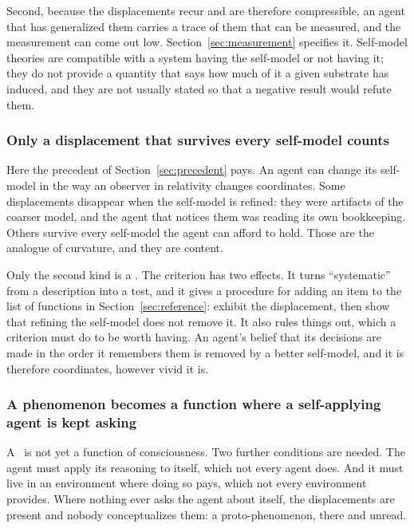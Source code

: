 Second, because the displacements recur and are therefore compressible, an agent that has generalized
them carries a trace of them that can be measured, and the measurement can come out low.
Section~\ref{sec:measurement} specifies it. Self-model theories are compatible with a system having the
self-model or not having it; they do not provide a quantity that says how much of it a given substrate
has induced, and they are not usually stated so that a negative result would refute them.

\subsubsection{Only a displacement that survives every self-model counts}
\label{sec:criterion}

Here the precedent of Section~\ref{sec:precedent} pays. An agent can change its self-model in the way an
observer in relativity changes coordinates. Some displacements disappear when the self-model is
refined: they were artifacts of the coarser model, and the agent that notices them was reading its own
bookkeeping. Others survive every self-model the agent can afford to hold. Those are the analogue of
curvature, and they are content.

Only the second kind is a \hocp. The criterion has two effects. It turns ``systematic'' from a
description into a test, and it gives a procedure for adding an item to the list of functions in
Section~\ref{sec:reference}: exhibit the displacement, then show that refining the self-model does not
remove it. It also rules things out, which a criterion must do to be worth having. An agent's belief
that its decisions are made in the order it remembers them is removed by a better self-model, and it is
therefore coordinates, however vivid it is.

\subsubsection{A phenomenon becomes a function where a self-applying agent is kept asking}
\label{sec:emergence}

A \hocp\ is not yet a function of consciousness. Two further conditions are needed. The agent must apply
its reasoning to itself, which not every agent does. And it must live in an environment where doing so
pays, which not every environment provides. Where nothing ever asks the agent about itself, the
displacements are present and nobody conceptualizes them: a proto-phenomenon, there and unread.

